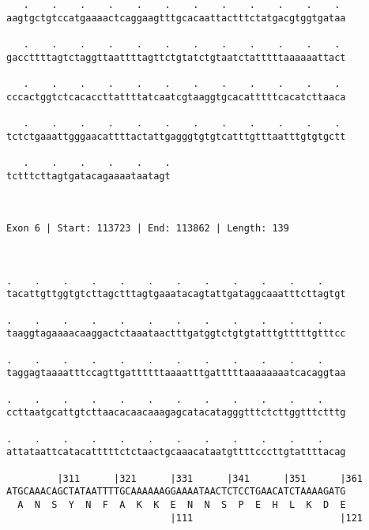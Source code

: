 \documentclass{article}
\begin{document}
\begin{Verbatim}
   .    .    .    .    .    .    .    .    .    .    .    . 
aagtgctgtccatgaaaactcaggaagtttgcacaattactttctatgacgtggtgataa
                                                            
   .    .    .    .    .    .    .    .    .    .    .    . 
gaccttttagtctaggttaattttagttctgtatctgtaatctatttttaaaaaattact
                                                            
   .    .    .    .    .    .    .    .    .    .    .    . 
cccactggtctcacaccttattttatcaatcgtaaggtgcacatttttcacatcttaaca
                                                            
   .    .    .    .    .    .    .    .    .    .    .    . 
tctctgaaattgggaacattttactattgagggtgtgtcatttgtttaatttgtgtgctt
                                                            
   .    .    .    .    .    .
tctttcttagtgatacagaaaataatagt
                             
                             
 
Exon 6 | Start: 113723 | End: 113862 | Length: 139



.    .    .    .    .    .    .    .    .    .    .    .    
tacattgttggtgtcttagctttagtgaaatacagtattgataggcaaatttcttagtgt
                                                            
.    .    .    .    .    .    .    .    .    .    .    .    
taaggtagaaaacaaggactctaaataactttgatggtctgtgtatttgtttttgtttcc
                                                            
.    .    .    .    .    .    .    .    .    .    .    .    
taggagtaaaatttccagttgattttttaaaatttgatttttaaaaaaaatcacaggtaa
                                                            
.    .    .    .    .    .    .    .    .    .    .    .    
ccttaatgcattgtcttaacacaacaaagagcatacatagggtttctcttggtttctttg
                                                            
.    .    .    .    .    .    .    .    .    .    .    .    
attataattcatacatttttctctaactgcaaacataatgttttcccttgtattttacag
                                                            
         |311      |321      |331      |341      |351      |361
ATGCAAACAGCTATAATTTTGCAAAAAAGGAAAATAACTCTCCTGAACATCTAAAAGATG
  A  N  S  Y  N  F  A  K  K  E  N  N  S  P  E  H  L  K  D  E
                             |111                          |121
  

\end{Verbatim}
\end{document}
